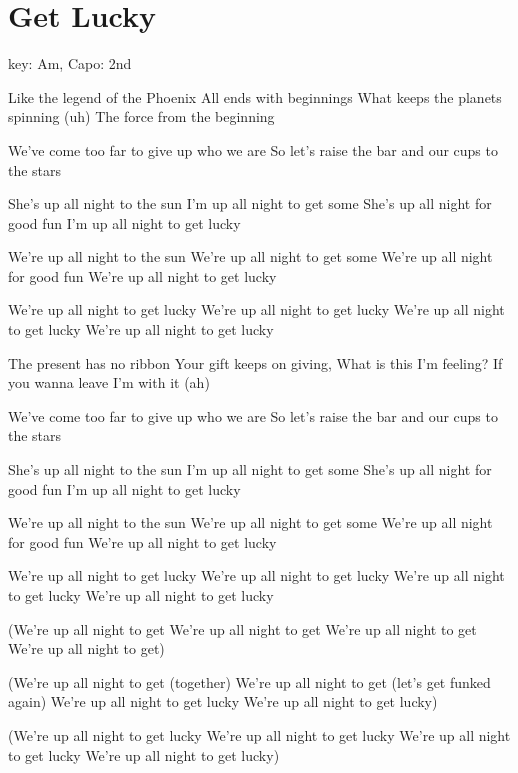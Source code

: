 \documentclass[../../songbookMain]{subfiles}
\begin{document}
\section{Get Lucky}
        {\tiny
          key: Am, Capo: 2nd
        }


\begin{guitar}
  \begin{multicols}{2}
    Like the legend of the Phoenix
    All ends with beginnings
    What keeps the planets spinning (uh)
    The force from the beginning

    We've come too far to give up who we are
    So let's raise the bar and our cups to the stars

She's up all night to the sun
I'm up all night to get some
She's up all night for good fun
I'm up all night to get lucky

We're up all night to the sun
We're up all night to get some
We're up all night for good fun
We're up all night to get lucky

We're up all night to get lucky
We're up all night to get lucky
We're up all night to get lucky
We're up all night to get lucky

The present has no ribbon
Your gift keeps on giving,
What is this I'm feeling?
If you wanna leave I'm with it (ah)

We've come too far to give up who we are
So let's raise the bar and our cups to the stars

She's up all night to the sun
I'm up all night to get some
She's up all night for good fun
I'm up all night to get lucky

We're up all night to the sun
We're up all night to get some
We're up all night for good fun
We're up all night to get lucky

We're up all night to get lucky
We're up all night to get lucky
We're up all night to get lucky
We're up all night to get lucky

(We're up all night to get
We're up all night to get
We're up all night to get
We're up all night to get)

(We're up all night to get (together)
We're up all night to get (let's get funked again)
We're up all night to get lucky
We're up all night to get lucky)

(We're up all night to get lucky
We're up all night to get lucky
We're up all night to get lucky
We're up all night to get lucky)


\end{multicols}
\end{guitar}
\end{document}
